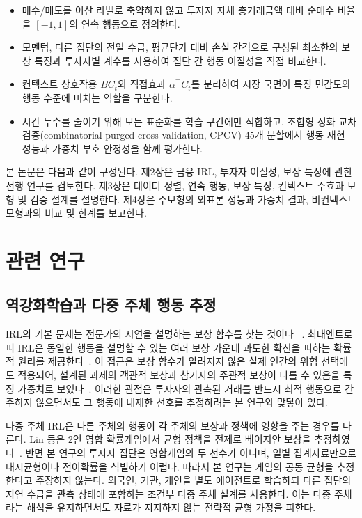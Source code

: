 \documentclass[sigconf,nonacm]{acmart}
\begin{document}
\begin{itemize}
  \item 매수/매도를 이산 라벨로 축약하지 않고 투자자 자체 총거래금액 대비
  순매수 비율을 $[-1,1]$의 연속 행동으로 정의한다.
  \item 모멘텀, 다른 집단의 전일 수급, 평균단가 대비 손실 간격으로 구성된 최소한의
  보상 특징과 투자자별 계수를 사용하여 집단 간 행동 이질성을 직접 비교한다.
  \item 컨텍스트 상호작용 $B C_t$와 직접효과 $\alpha^\top C_t$를 분리하여 시장
  국면이 특징 민감도와 행동 수준에 미치는 역할을 구분한다.
  \item 시간 누수를 줄이기 위해 모든 표준화를 학습 구간에만 적합하고, 조합형 정화
  교차검증(combinatorial purged cross-validation, CPCV) 45개 분할에서 행동
  재현 성능과 가중치 부호 안정성을 함께 평가한다.
\end{itemize}

본 논문은 다음과 같이 구성된다. 제2장은 금융 IRL, 투자자 이질성, 보상 특징에
관한 선행 연구를 검토한다. 제3장은 데이터 정렬, 연속 행동, 보상 특징, 컨텍스트
주효과 모형 및 검증 설계를 설명한다. 제4장은 주모형의 외표본 성능과 가중치 결과,
비컨텍스트 모형과의 비교 및 한계를 보고한다.

\section{관련 연구}

\subsection{역강화학습과 다중 주체 행동 추정}

IRL의 기본 문제는 전문가의 시연을 설명하는 보상 함수를 찾는 것이다
~\cite{ng2000algorithms}. 최대엔트로피 IRL은 동일한 행동을 설명할 수 있는 여러
보상 가운데 과도한 확신을 피하는 확률적 원리를 제공한다~\cite{ziebart2008maximum}.
이 접근은 보상 함수가 알려지지 않은 실제 인간의 위험 선택에도 적용되어, 설계된
과제의 객관적 보상과 참가자의 주관적 보상이 다를 수 있음을 특징 가중치로
보였다~\cite{liu2019risk}. 이러한 관점은 투자자의 관측된 거래를 반드시 최적
행동으로 간주하지 않으면서도 그 행동에 내재한 선호를 추정하려는 본 연구와 맞닿아
있다.

다중 주체 IRL은 다른 주체의 행동이 각 주체의 보상과 정책에 영향을 주는 경우를
다룬다. Lin 등은 2인 영합 확률게임에서 균형 정책을 전제로 베이지안 보상을
추정하였다~\cite{lin2018multiagent}. 반면 본 연구의 투자자 집단은 영합게임의
두 선수가 아니며, 일별 집계자료만으로 내시균형이나 전이확률을 식별하기 어렵다.
따라서 본 연구는 게임의 공동 균형을 추정한다고 주장하지 않는다. 외국인, 기관,
개인을 별도 에이전트로 학습하되 다른 집단의 지연 수급을 관측 상태에 포함하는
조건부 다중 주체 설계를 사용한다. 이는 다중 주체라는 해석을 유지하면서도 자료가
지지하지 않는 전략적 균형 가정을 피한다.
\end{document}
